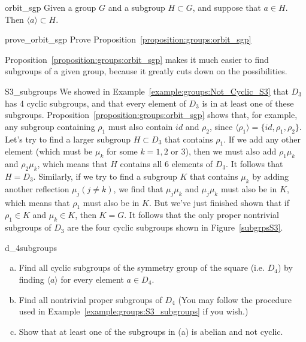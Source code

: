 \begin{prop}{orbit_sgp}
Given a group $G$ and a subgroup $H \subset G$, and suppose that $a \in H$.  Then $\langle a \rangle \subset H$.
\end{prop}

\begin{exercise}{prove_orbit_sgp}
Prove Proposition~\ref{proposition:groups:orbit_sgp}
\end{exercise}

Proposition~\ref{proposition:groups:orbit_sgp} makes it much easier to find subgroups of a given group, because it greatly cuts down
on the possibilities.

\begin{example}{S3_subgroups}
We showed in Example~\ref{example:groups:Not_Cyclic_S3} that $D_3$ has 4 cyclic subgroups, and that every element of $D_3$ is in at least one of these subgroups.  Proposition~\ref{proposition:groups:orbit_sgp} shows that, for example, any subgroup containing $\rho_1$ must also contain $id$ and  $\rho_2$, since $\langle \rho_1 \rangle = \{id, \rho_1, \rho_2\}$.  Let's try to find a larger subgroup $H \subset D_3$ that contains $\rho_1$.  If we add any other element  (which must be  $\mu_k$ for some $k=1,2$ or $3$), then we must also add $\rho_1 \mu_k$ and $\rho_2 \mu_k$, which means that $H$ contains  all 6 elements of $D_3$. It follows that $H=D_3$. Similarly, if we try to find a subgroup $K$ that contains $\mu_k$ by adding another reflection $\mu_j (j \neq k)$, we find that $\mu_j \mu_k$ and $\mu_j \mu_k$  must also be in $K$, which means that $\rho_1$ must also be in $K$. But we've just finished shown that if $\rho_1 \in K$ and $\mu_k \in K$, then  $K=G$.  It follows that the only proper nontrivial subgroups of $D_3$ are the four cyclic subgroups shown in Figure~\ref{subgrpsS3}.
\end{example}

\begin{exercise}{d_4subgroups}
\begin{enumerate}[(a)]
\item
Find all cyclic subgroups of  the symmetry group of the square (i.e. $D_4$)  by finding $\langle a \rangle$ for every element $a \in D_4$.
\item
Find all nontrivial proper subgroups of $D_4$  (You may follow the procedure used in Example~\ref{example:groups:S3_subgroups} if you wish.) 
\item
Show that at least one of the subgroups in (a)  is abelian and not cyclic.
\end{enumerate}
\end{exercise}      


